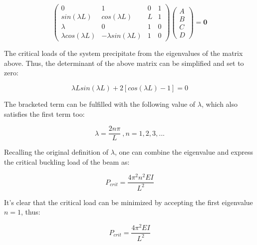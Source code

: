 \begin{equation} 
\begin{pmatrix}
0 & 1 & 0 & 1 \\
sin(\lambda L) & cos(\lambda L) & L & 1\\
\lambda & 0 & 1 & 0 \\
\lambda cos(\lambda L) & -\lambda sin(\lambda L) & 1 & 0
\end{pmatrix}
\begin{pmatrix}
A \\
B \\
C \\
D
\end{pmatrix}
=
\mathbf{0}
\label{eqapp4_6}
\end{equation}

The critical loads of the system precipitate from the eigenvalues of the matrix above. Thus, the determinant of the above matrix can be simplified and set to zero:

\begin{equation} 
\lambda L sin(\lambda L) + 2[cos(\lambda L) - 1] = 0
\label{eqapp4_7}
\end{equation}

The bracketed term can be fulfilled with the following value of $\lambda$, which also satisfies the first term too:

\begin{equation} 
\lambda = \frac{2n\pi}{L}\ ,
n = 1, 2, 3, ...
\label{eqapp4_8}
\end{equation}

Recalling the original definition of $\lambda$, one can combine the eigenvalue and express the critical buckling load of the beam as:

\begin{equation} 
P_{crit} = \frac{4\pi^2 n^2 EI}{L^2}
\label{eqapp4_9}
\end{equation}

It's clear that the critical load can be minimized by accepting the first eigenvalue $n=1$, thus:

\begin{equation} 
P_{crit} = \frac{4\pi^2 EI}{L^2}
\label{eqapp4_10}
\end{equation}